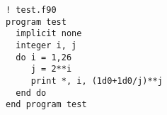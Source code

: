 \documentclass[uplatex]{jsarticle}
\begin{document}
\begin{lstlisting}[language={[90]Fortran}]
! test.f90
program test
  implicit none
  integer i, j
  do i = 1,26
     j = 2**i
     print *, i, (1d0+1d0/j)**j
  end do
end program test
\end{lstlisting}
\end{document}
